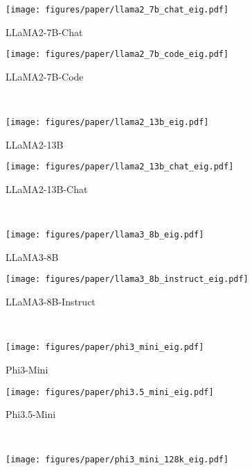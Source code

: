 \begin{figure*}[!t]
    \centering
    \begin{subfigure}[t]{0.49\textwidth}
        \texttt{[image: figures/paper/llama2\_7b\_chat\_eig.pdf]}
        \caption{LLaMA2-7B-Chat}\label{fig:llama2_7b_chat_eig}
    \end{subfigure}
    \begin{subfigure}[t]{0.49\textwidth}
        \texttt{[image: figures/paper/llama2\_7b\_code\_eig.pdf]}
        \caption{LLaMA2-7B-Code}\label{fig:llama2_7b_code_eig}
    \end{subfigure}\\
    \begin{subfigure}[t]{0.49\textwidth}
        \texttt{[image: figures/paper/llama2\_13b\_eig.pdf]}
        \caption{LLaMA2-13B}\label{fig:llama2_13b_eig}
    \end{subfigure}
    \begin{subfigure}[t]{0.49\textwidth}
        \texttt{[image: figures/paper/llama2\_13b\_chat\_eig.pdf]}
        \caption{LLaMA2-13B-Chat}\label{fig:llama2_13b_chat_eig}
    \end{subfigure}\\
    \begin{subfigure}[t]{0.49\textwidth}
        \texttt{[image: figures/paper/llama3\_8b\_eig.pdf]}
        \caption{LLaMA3-8B}\label{fig:llama3_8b_eig}
    \end{subfigure}
    \begin{subfigure}[t]{0.49\textwidth}
        \texttt{[image: figures/paper/llama3\_8b\_instruct\_eig.pdf]}
        \caption{LLaMA3-8B-Instruct}\label{fig:llama3_8b_instruct_eig}
    \end{subfigure}\\
    \begin{subfigure}[t]{0.49\textwidth}
        \texttt{[image: figures/paper/phi3\_mini\_eig.pdf]}
        \caption{Phi3-Mini}\label{fig:phi3_mini_eig}
    \end{subfigure}
    \begin{subfigure}[t]{0.49\textwidth}
        \texttt{[image: figures/paper/phi3.5\_mini\_eig.pdf]}
        \caption{Phi3.5-Mini}\label{fig:phi3.5_mini_eig}
    \end{subfigure}\\
    \begin{subfigure}[t]{0.49\textwidth}
        \texttt{[image: figures/paper/phi3\_mini\_128k\_eig.pdf]}

\end{subfigure}
\end{figure*}
